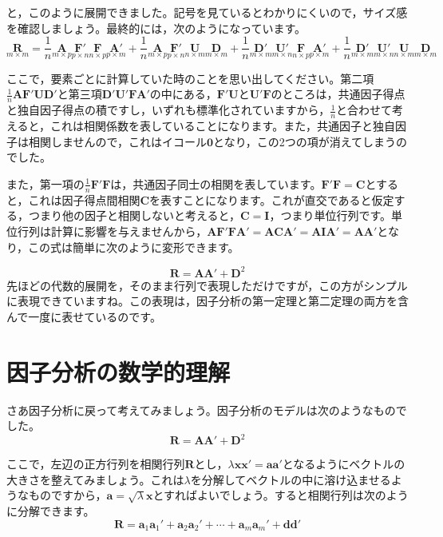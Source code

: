 \documentclass{ltjsbook}
\begin{document}
と，このように展開できました。記号を見ているとわかりにくいので，サイズ感を確認しましょう。最終的には，次のようになっています。
\[
    \underset{m \times m}{\bm{R}} =
    \frac{1}{n} \underset{m \times p}{\bm{A}} \underset{p \times n}{\bm{F}'} \underset{n \times p}{\bm{F}} \underset{p \times m}{\bm{A}'} +
    \frac{1}{n} \underset{m \times p}{\bm{A}} \underset{p \times n}{\bm{F}'} \underset{n \times m}{\bm{U}} \underset{m \times m}{\bm{D}} +
    \frac{1}{n} \underset{m \times m}{\bm{D}'} \underset{m \times n}{\bm{U}'} \underset{n \times p}{\bm{F}} \underset{p \times m}{\bm{A}'} +
    \frac{1}{n} \underset{m \times m}{\bm{D}'} \underset{m \times n}{\bm{U}'} \underset{n \times m}{\bm{U}} \underset{m \times m}{\bm{D}}
\]

ここで，要素ごとに計算していた時のことを思い出してください。第二項$\frac{1}{n} \bm{A} \bm{F}'\bm{U} \bm{D}'$と第三項$\bm{D}' \bm{U}' \bm{F} \bm{A}'$の中にある，$\bm{F}' \bm{U}$と$\bm{U}' \bm{F}$のところは，共通因子得点と独自因子得点の積ですし，いずれも標準化されていますから，$\frac{1}{n}$と合わせて考えると，これは相関係数を表していることになります。また，共通因子と独自因子は相関しませんので，これはイコール$\bm{0}$となり，この2つの項が消えてしまうのでした。

また，第一項の$\frac{1}{n}\bm{F} ' \bm{F}$は，共通因子同士の相関を表しています。$\bm{F'F}=\bm{C}$とすると，これは因子得点間相関$\bm{C}$を表すことになります。これが直交であると仮定する，つまり他の因子と相関しないと考えると，$\bm{C} = \bm{I}$，つまり単位行列です。単位行列は計算に影響を与えませんから，$\bm{AF'FA'}=\bm{ACA'}=\bm{AIA'}=\bm{AA'}$となり，この式は簡単に次のように変形できます。

\begin{equation}
    \bm{R} = \bm{A} \bm{A} ' + \bm{D}^2
\end{equation}
先ほどの代数的展開を，そのまま行列で表現しただけですが，この方がシンプルに表現できていますね。この表現は，因子分析の第一定理と第二定理の両方を含んで一度に表せているのです。


\section{因子分析の数学的理解}
さあ因子分析に戻って考えてみましょう。因子分析のモデルは次のようなものでした。
\begin{equation}
    \bm{R} = \bm{A} \bm{A} ' + \bm{D}^2
\end{equation}

ここで，左辺の正方行列を相関行列$\bm{R}$とし，$\lambda \bm{xx'} = \bm{aa'}$となるようにベクトルの大きさを整えてみましょう。これは$\lambda$を分解してベクトルの中に溶け込ませるようなものですから，$\bm{a} = \sqrt{\lambda}\bm{x}$とすればよいでしょう。すると相関行列は次のように分解できます。
\begin{equation}
    \bm{R}=\bm{a}_1\bm{a}_1'+\bm{a}_2\bm{a}_2'+\cdots +\bm{a}_m\bm{a}_m'+\bm{d} \bm{d}'
\end{equation}
\end{document}
